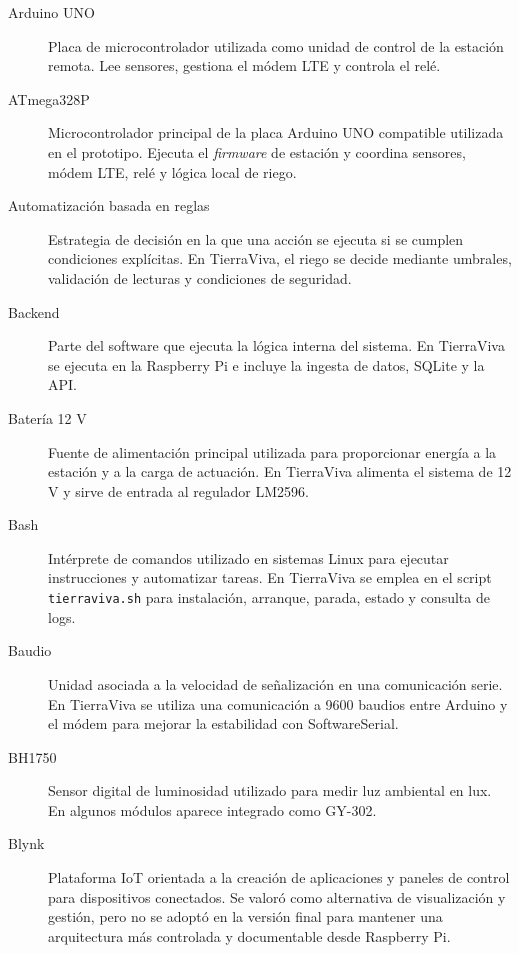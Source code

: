 \begin{description}
    \item[Arduino UNO]
    Placa de microcontrolador utilizada como unidad de control de la estación remota. Lee sensores, gestiona el módem LTE y controla el relé.

    \item[ATmega328P]
    Microcontrolador principal de la placa Arduino UNO compatible utilizada en el prototipo. Ejecuta el \textit{firmware} de estación y coordina sensores, módem LTE, relé y lógica local de riego.

    \item[Automatización basada en reglas]
    Estrategia de decisión en la que una acción se ejecuta si se cumplen condiciones explícitas. En TierraViva, el riego se decide mediante umbrales, validación de lecturas y condiciones de seguridad.

    \item[Backend]
    Parte del software que ejecuta la lógica interna del sistema. En TierraViva se ejecuta en la Raspberry Pi e incluye la ingesta de datos, SQLite y la API.

    \item[Batería 12 V]
    Fuente de alimentación principal utilizada para proporcionar energía a la estación y a la carga de actuación. En TierraViva alimenta el sistema de 12 V y sirve de entrada al regulador LM2596.

    \item[Bash]
    Intérprete de comandos utilizado en sistemas Linux para ejecutar instrucciones y automatizar tareas. En TierraViva se emplea en el script \texttt{tierraviva.sh} para instalación, arranque, parada, estado y consulta de logs.

    \item[Baudio]
    Unidad asociada a la velocidad de señalización en una comunicación serie. En TierraViva se utiliza una comunicación a 9600 baudios entre Arduino y el módem para mejorar la estabilidad con SoftwareSerial.

    \item[BH1750]
    Sensor digital de luminosidad utilizado para medir luz ambiental en lux. En algunos módulos aparece integrado como GY-302.

    \item[Blynk]
    Plataforma IoT orientada a la creación de aplicaciones y paneles de control para dispositivos conectados. Se valoró como alternativa de visualización y gestión, pero no se adoptó en la versión final para mantener una arquitectura más controlada y documentable desde Raspberry Pi.


\end{description}
